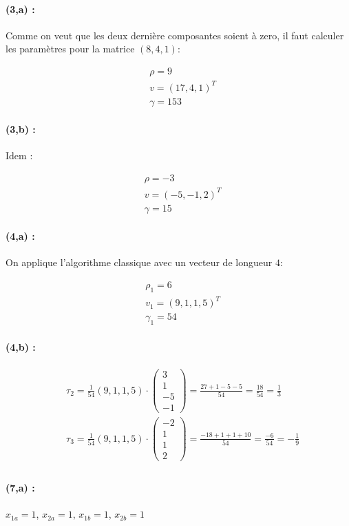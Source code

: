 \documentclass[a4paper,9pt]{extarticle}
\newcommand{\matdddd}[4]{\begin{pmatrix}#1\\#2\\#3\\#4\end{pmatrix}}
\begin{document}
\paragraph*{(3,a) : } Comme on veut que les deux dernière composantes soient à zero, il faut calculer les paramètres pour la matrice $(8,4,1)$:

\begin{align*}
& \rho = 9 \\
& v = (17,4,1)^T \\
& \gamma = 153
\end{align*}

\paragraph*{(3,b) : } Idem :

\begin{align*}
& \rho = -3 \\
& v = (-5,-1,2)^T \\
& \gamma = 15
\end{align*}

\paragraph*{(4,a) : } On applique l'algorithme classique avec un vecteur de longueur $4$:

\begin{align*}
& \rho_1 = 6 \\
& v_1 = (9,1,1,5)^T \\
& \gamma_1 = 54
\end{align*}

\paragraph*{(4,b) : } 

\begin{align*}
& \tau_2 = \frac{1}{54} (9,1,1,5) \cdot \matdddd{3}{1}{-5}{-1} = \frac{27+1-5-5}{54} = \frac{18}{54} = \frac{1}{3} \\
& \tau_3 = \frac{1}{54} (9,1,1,5) \cdot \matdddd{-2}{1}{1}{2} = \frac{-18+1+1+10}{54} = \frac{-6}{54} = -\frac{1}{9} \\
\end{align*}

\paragraph*{(7,a) : }
$x_{1a} = 1$, $x_{2a} = 1$, $x_{1b} = 1$, $x_{2b} = 1$
\end{document}
